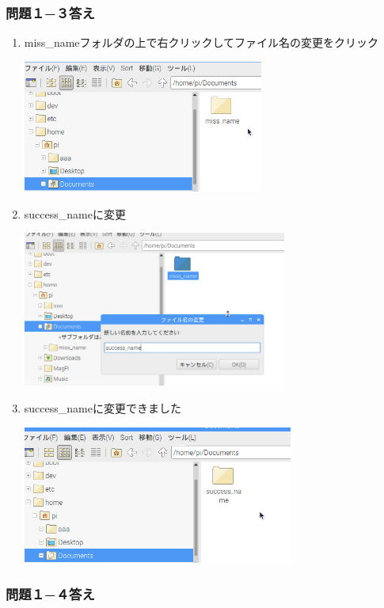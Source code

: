 \documentclass[a4paper,12pt]{jarticle}
\begin{document}
\clearpage\subsubsection{\bfseries
問題１−３答え}


\begin{enumerate}
\item
miss\_nameフォルダの上で右クリックしてファイル名の変更をクリック

\centering
\includegraphics[width=7.913cm,height=4.344cm]{textbook-img214.png}
\flushleft

\item success\_nameに変更

\centering
\includegraphics[width=8.694cm,height=5.115cm]{textbook-img215.png}
\flushleft
\item success\_nameに変更できました

\centering
\includegraphics[width=8.895cm,height=4.542cm]{textbook-img216.png}
\flushleft
\end{enumerate}



\subsubsection{\bfseries
問題１−４答え}
\end{document}
